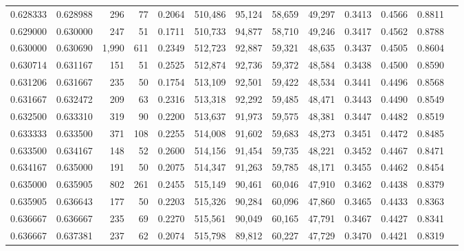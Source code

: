 \begin{tabular}{rrrrrrrrrrrrr}
0.628333 & 0.628988 &   296 &  77 &                                     0.2064 & 510,486 &  95,124 &  58,659 &  49,297 & 0.3413 & 0.4566 & 0.8811 \\
0.629000 & 0.630000 &   247 &  51 &                                     0.1711 & 510,733 &  94,877 &  58,710 &  49,246 & 0.3417 & 0.4562 & 0.8788 \\
0.630000 & 0.630690 & 1,990 & 611 &                                     0.2349 & 512,723 &  92,887 &  59,321 &  48,635 & 0.3437 & 0.4505 & 0.8604 \\
0.630714 & 0.631167 &   151 &  51 &                                     0.2525 & 512,874 &  92,736 &  59,372 &  48,584 & 0.3438 & 0.4500 & 0.8590 \\
0.631206 & 0.631667 &   235 &  50 &                                     0.1754 & 513,109 &  92,501 &  59,422 &  48,534 & 0.3441 & 0.4496 & 0.8568 \\
0.631667 & 0.632472 &   209 &  63 &                                     0.2316 & 513,318 &  92,292 &  59,485 &  48,471 & 0.3443 & 0.4490 & 0.8549 \\
0.632500 & 0.633310 &   319 &  90 &                                     0.2200 & 513,637 &  91,973 &  59,575 &  48,381 & 0.3447 & 0.4482 & 0.8519 \\
0.633333 & 0.633500 &   371 & 108 &                                     0.2255 & 514,008 &  91,602 &  59,683 &  48,273 & 0.3451 & 0.4472 & 0.8485 \\
0.633500 & 0.634167 &   148 &  52 &                                     0.2600 & 514,156 &  91,454 &  59,735 &  48,221 & 0.3452 & 0.4467 & 0.8471 \\
0.634167 & 0.635000 &   191 &  50 &                                     0.2075 & 514,347 &  91,263 &  59,785 &  48,171 & 0.3455 & 0.4462 & 0.8454 \\
0.635000 & 0.635905 &   802 & 261 &                                     0.2455 & 515,149 &  90,461 &  60,046 &  47,910 & 0.3462 & 0.4438 & 0.8379 \\
0.635905 & 0.636643 &   177 &  50 &                                     0.2203 & 515,326 &  90,284 &  60,096 &  47,860 & 0.3465 & 0.4433 & 0.8363 \\
0.636667 & 0.636667 &   235 &  69 &                                     0.2270 & 515,561 &  90,049 &  60,165 &  47,791 & 0.3467 & 0.4427 & 0.8341 \\
0.636667 & 0.637381 &   237 &  62 &                                     0.2074 & 515,798 &  89,812 &  60,227 &  47,729 & 0.3470 & 0.4421 & 0.8319 \\

\end{tabular}
